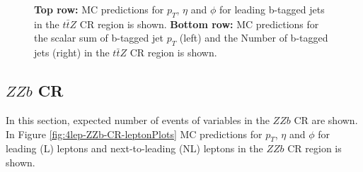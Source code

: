 \begin{figure}[htbp]
    \caption{\textbf{Top row:} MC predictions for $p_{T}$, $\eta$ and $\phi$ for leading b-tagged jets in the $t\bar{t}Z$ CR region  is shown. \textbf{Bottom row:} MC predictions for the scalar sum of b-tagged jet $p_{T}$ (left) and the Number of b-tagged jets (right) in the $t\bar{t}Z$ CR region  is shown.}
  \label{fig:4lep-ttZ-CR-bjetPlots}
\end{figure}




\subsection{$ZZb$ CR}
\label{sec:controlplotstetralepton-ZZb-CR}


In this section, expected number of events of variables in the $ZZb$ CR are shown.\\

In Figure \ref{fig:4lep-ZZb-CR-leptonPlots} MC predictions for $p_{T}$, $\eta$ and $\phi$ for leading (L) leptons and next-to-leading (NL) leptons in the $ZZb$ CR region is shown.


